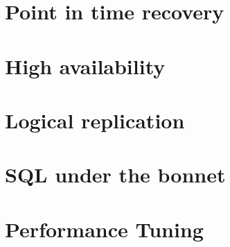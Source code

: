 \documentclass[twoside]{book}
\begin{document}
\tableofcontents{}






\chapter{Point in time recovery}
\chapter{High availability}
\chapter{Logical replication}
\chapter{SQL under the bonnet}
\chapter{Performance Tuning}

\appendix

\listoffigures
\listoftables
\printindex{}
\end{document}
